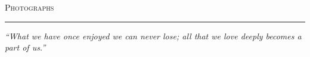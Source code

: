 



\vspace*{\fill}

\begin{center}
  {\Large\scshape\color{primary} Photographs}

  \vspace{3mm}
  {\color{rulecolor}\rule{18mm}{0.4pt}}

  \vspace{4mm}
  \begin{minipage}{0.82\linewidth}
    \centering\small\itshape\color{accent}
    ``What we have once enjoyed we can never lose; all that we love deeply
    becomes a part of us.''
  \end{minipage}
\end{center}

\vspace*{6mm}

\newpage

%
%
\vspace*{2mm}

{\centering
{}\par}

